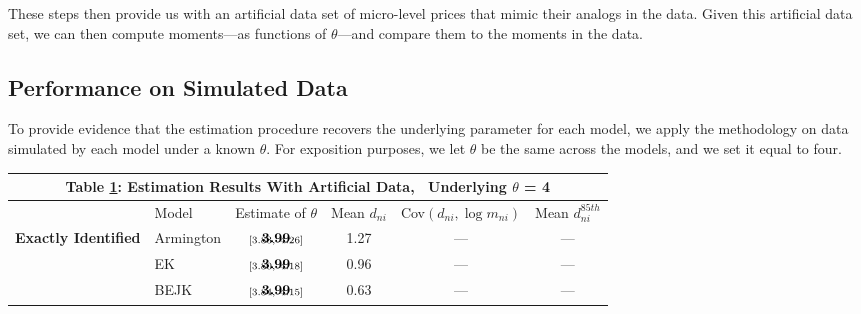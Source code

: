 \documentclass[12pt,dvips, ps2pdf]{article}
\renewcommand{\arraystretch}{1.1}
\begin{document}
These steps then provide us with an artificial data set of micro-level prices that mimic their analogs in the data. Given this artificial data set, we can then compute moments---as functions of $\theta$---and compare them to the moments in the data.

\subsection{Performance on Simulated Data}

To provide evidence that the estimation procedure recovers the underlying parameter for each model, we apply the methodology on data simulated by each model under a known $\theta$. For exposition purposes, we let $\theta$ be the same across the models, and we set it equal to four.

\begin{table}[!h]
\footnotesize
{}
\renewcommand{\arraystretch}{1.65}
\setlength {\tabcolsep}{1.75mm}
\begin{center}\label{tb:monte_carlo_data_rslts}
\begin{tabular}[t]{l l  c | c c c}
\multicolumn{6}{c}{\normalsize\textbf{Table \ref{tb:monte_carlo_data_rslts}: Estimation Results With Artificial Data, \ {Underlying $\theta$ = 4}}}
\\
\hline
\hline
 & Model &  Estimate of $\theta$ &  Mean $d_{ni}$  &  Cov$(d_{ni}, \log m_{ni})$ & Mean $d^{85th}_{ni}$\\
\hline
\multirow{4}{*}{\textbf{Exactly Identified}} &  Armington   & $\begin{array}{c}{\textbf{3.99}} \vspace{-.4cm}\\ \scriptstyle{[3.83,   \ 4.26]}\end{array}$   & 1.27 & ---  & ---  \\
& EK              & $\begin{array}{c}{\textbf{3.99}} \vspace{-.4cm}\\ \scriptstyle{[3.80,   \ 4.18]}\end{array}$  & 0.96 & --- & ---            \\
&  BEJK            & $\begin{array}{c}{\textbf{3.99}} \vspace{-.4cm}\\ \scriptstyle{[3.84,   \ 4.15]}\end{array}$     & 0.63 & --- & ---            \\

\end{tabular}
\end{center}
\end{table}
\end{document}
